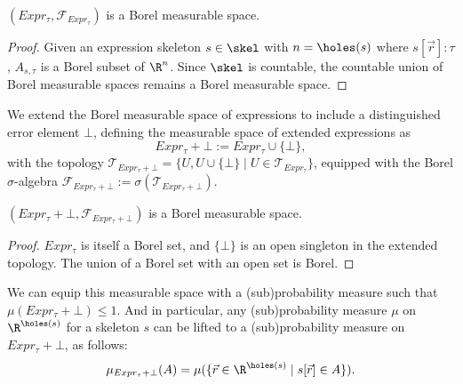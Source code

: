 \begin{lemma}
	$(Expr_{\tau}, \mathcal{F}_{Expr_{\tau}})$ is a Borel measurable space.
\end{lemma}

\begin{proof}
	Given an expression skeleton $s \in \skel$ with $n = \holes(s)$ where $s[\vec{r}] : \tau$, $A_{s,\tau}$ is a Borel subset of $\R^n$. Since $\skel$ is countable, the countable union of Borel measurable spaces remains a Borel measurable space.
\end{proof}


\begin{definition}\label{def:meas-space-with-error}
	We extend the Borel measurable space of expressions to include a distinguished error element $\bot$, defining the measurable space of extended expressions as
	\[
		Expr_{\tau} + \bot := Expr_{\tau} \cup \{\bot\},
	\]
	with the topology $\mathcal{T}_{Expr_{\tau} + \bot} = \{U, U \cup \{\bot\} \mid U \in \mathcal{T}_{Expr_{\tau}}\}$, equipped with the Borel $\sigma$-algebra $\mathcal{F}_{Expr_{\tau} + \bot} := \sigma(\mathcal{T}_{Expr_{\tau} + \bot})$.
\end{definition}

\begin{lemma}
	$(Expr_{\tau} + \bot, \mathcal{F}_{Expr_{\tau} + \bot})$ is a Borel measurable space.
\end{lemma}

\begin{proof}
	$Expr_{\tau}$ is itself a Borel set, and $\{\bot\}$ is an open singleton in the extended topology. The union of a Borel set with an open set is Borel. 
\end{proof}


We can equip this measurable space with a (sub)probability measure such that $\mu(Expr_{\tau} + \bot) \leq 1$. And in particular, any (sub)probability measure $\mu$ on $\R^{\holes(s)}$ for a skeleton $s$ can be lifted to a (sub)probability measure on $Expr_{\tau} + \bot$, as follows: 
\[
	\mu_{Expr_{\tau} + \bot}(A) = \mu(\{\vec{r} \in \R^{\holes(s)} \mid s[\vec{r}] \in A\}).
\]

